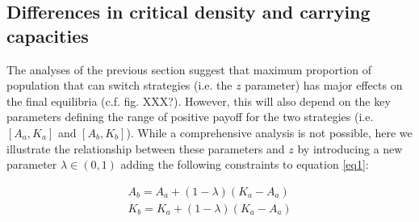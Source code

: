 \documentclass[review,authoryear]{elsarticle}
\begin{document}


\subsection{Differences in critical density and carrying capacities}

The analyses of the previous section suggest that maximum proportion of population that can switch strategies (i.e. the $z$ parameter) has major effects on the final equilibria (c.f. fig. XXX?). However, this will also depend on the key parameters defining the range of positive payoff for the two strategies (i.e. $[A_a,K_a]$ and $[A_b,K_b]$). While a comprehensive analysis is not possible, here we illustrate the relationship between these parameters and $z$ by introducing a new parameter $\lambda \in (0,1)$ adding the following constraints to equation \eqref{eq1}: 

\begin{equation}
\begin{aligned}
\label{eqOverlap}
A_b = A_a + (1-\lambda)(K_a-A_a)\\
K_b = K_a + (1-\lambda)(K_a-A_a)
\end{aligned}
\end{equation}
\end{document}
